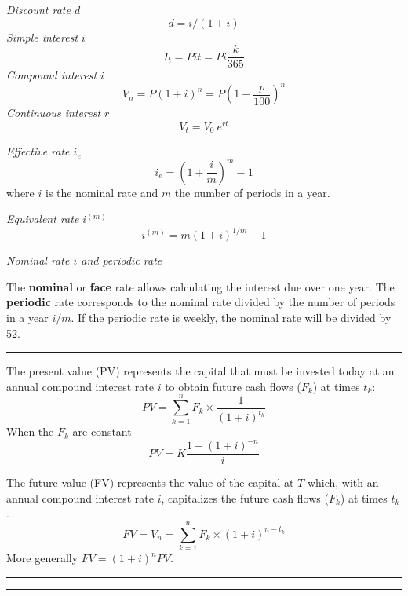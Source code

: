 \begin{f}[Interests]

\emph{Discount rate $d$}
     $$d=i/(1+i)$$
\emph{Simple interest $i$}
$$
I_t=P i t=P i \frac{k}{365}
$$
\emph{Compound interest $i$}
$$
V_n=P(1+i)^n=P\left(1+\frac{p}{100}\right)^n
$$
\emph{Continuous interest $r$}
$$V_t=V_0\ e^{rt}$$

\emph{Effective rate $i_e$}
$$
i_e=\left( 1+\frac{i}{m}\right) ^{m}-1
$$
where $i$ is the nominal rate and $m$ the number of periods in a year.

\emph{Equivalent rate $i^{(m)}$}
$$
i^{(m)}=m(1+i)^{1 / m}-1
$$

\emph{Nominal rate $i$ and periodic rate}

The \textbf{nominal} or \textbf{face} rate allows calculating the interest due over one year.
The \textbf{periodic} rate corresponds to the nominal rate divided by the number of periods in a year $i/m$.
If the periodic rate is weekly, the nominal rate will be divided by 52.
\end{f}
\hrule

\begin{f}

The present value (PV) represents the capital that must be invested today at an annual compound interest rate $i$ to obtain future cash flows ($F_k$) at times $t_k$:
\begin{equation}
	PV = \sum_{k=1}^{n} F_k \times \frac{1}{(1+i)^{t_k}}
\label{ValeurActuelle}
\end{equation}
When the $F_k$ are constant
\begin{equation}
	PV = K  \frac{1 - (1+i)^{-n}} {i}
\label{ValeurActuelleFluxCt}
\end{equation}

The future value (FV) represents the value of the capital at $T$ which, with an annual compound interest rate $i$, capitalizes the future cash flows ($F_k$) at times $t_k$.
\begin{equation}
	FV=V_n = \sum_{k=1}^{n} F_k \times (1+i)^{n-t_k}
\end{equation}
More generally $FV= (1+i)^{n}PV$.
\end{f}
\hrule

\begin{f}[Annuities]

\end{f}
\hrule

